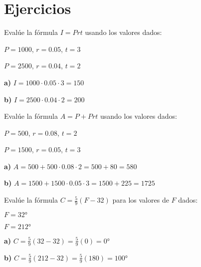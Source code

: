 
\section{Ejercicios}

\begin{exercise}
\problem Evalúe la fórmula $I = Prt$ usando los valores dados:

\begin{exerciselist}
    \item $P = 1000$, $r = 0.05$, $t = 3$
    \item $P = 2500$, $r = 0.04$, $t = 2$
\end{exerciselist}

\begin{solucion}
\textbf{a)} $I = 1000 \cdot 0.05 \cdot 3 = 150$

\textbf{b)} $I = 2500 \cdot 0.04 \cdot 2 = 200$
\end{solucion}

\problem Evalúe la fórmula $A = P + Prt$ usando los valores dados:

\begin{exerciselist}
    \item $P = 500$, $r = 0.08$, $t = 2$
    \item $P = 1500$, $r = 0.05$, $t = 3$
\end{exerciselist}

\begin{solucion}
\textbf{a)} $A = 500 + 500 \cdot 0.08 \cdot 2 = 500 + 80 = 580$

\textbf{b)} $A = 1500 + 1500 \cdot 0.05 \cdot 3 = 1500 + 225 = 1725$
\end{solucion}

\problem Evalúe la fórmula $C = \frac{5}{9}(F-32)$ para los valores de $F$ dados:

\begin{exerciselist}
    \item $F = 32°$
    \item $F = 212°$
\end{exerciselist}

\begin{solucion}
\textbf{a)} $C = \frac{5}{9}(32-32) = \frac{5}{9}(0) = 0°$

\textbf{b)} $C = \frac{5}{9}(212-32) = \frac{5}{9}(180) = 100°$
\end{solucion}
\end{exercise}

